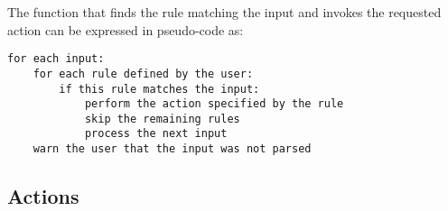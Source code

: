 \documentclass{svmult}
\begin{document}
The function that finds the rule matching the input and invokes the
requested action can be expressed in pseudo-code as:


\begin{verbatim}
for each input:
    for each rule defined by the user: 
        if this rule matches the input:
            perform the action specified by the rule
            skip the remaining rules
            process the next input
    warn the user that the input was not parsed
\end{verbatim}

\subsection{Actions}

\label{Actions}
\end{document}
